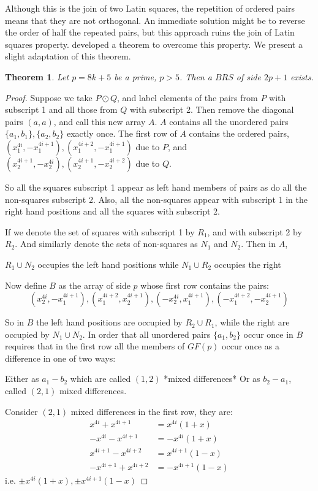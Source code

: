 \documentclass[
  11pt,
  a4paper]{book}\usepackage[]{graphicx}\usepackage[]{xcolor}
\newtheorem{theorem}{Theorem}
\begin{document}
Although this is the join of two Latin squares, the
repetition of ordered pairs means that they are not
orthogonal. An immediate solution might be to reverse the
order of half the repeated pairs, but this approach ruins
the join of Latin squares property.
\cite{andersonConstructionBalancedRoom1999}
developed a theorem to overcome this property. We present a
slight adaptation of this theorem.
\begin{theorem}
Let $p = 8k + 5$ be a prime, $p > 5$. Then a $BRS$ of side
$2p + 1$ exists.
\end{theorem}
\begin{proof}
Suppose we take $P \odot Q$, and label elements of the pairs
from $P$ with subscript 1 and all those from $Q$ with
subscript 2. Then remove the diagonal pairs $(a, a)$, and
call this new array $A$. $A$ contains all the unordered
pairs $\{a_1, b_1\},\{a_2, b_2\}$ exactly once. The first row
of $A$ contains the ordered pairs,
$(x_1^{4i}, -x_1^{4i + 1}), (x_1^{4i + 2}, -x_1^{4i + 1})$
due to $P$, and
$(x_2^{4i + 1}, -x_2^{4i}), (x_2^{4i + 1}, -x_2^{4i  +2})$
due to $Q$.

So all the squares subscript 1 appear as left hand members
of pairs as do all the non-squares subscript 2. Also, all
the non-squares appear with subscript 1 in the right hand
positions and all the squares with
subscript 2.

If we denote the set of squares with subscript 1 by $R_1$,
and with subscript 2 by $R_2$. And similarly denote the sets
of non-squares as $N_1$ and $N_2$. Then in $A$,

$R_1 \cup N_2$ occupies the left hand positions
while $N_1 \cup R_2$ occupies the right

Now define $B$ as the array of side $p$ whose first row
contains the pairs:
\begin{equation}
(x_2^{4i}, -x_1^{4i + 1}), (x_1^{4i + 2}, x_2^{4i + 1}), (-x_2^{4i}, x_1^{4i + 1}), (-x_1^{4i + 2}, -x_2^{4i + 1})
\end{equation}

So in $B$ the left hand positions are occupied by
$R_2 \cup R_1$, while the right are occupied by
$N_1 \cup N_2$.  In order that all unordered pairs
$\{a_1, b_2\}$ occur once in $B$ requires that in the first
row all the members of $GF(p)$ occur once as a difference
in one of two ways:

Either as $a_1 - b_2$ which are called $(1, 2)$
*mixed differences* Or as $b_2 - a_1$, called $(2, 1)$
mixed differences.

Consider $(2, 1)$ mixed differences in the first row, they
are:
\begin{align*}
       x^{4i} + x^{4i + 1} &= x^{4i}(1 + x)      \\
      -x^{4i} - x^{4i + 1} &=-x^{4i}(1 + x)      \\
   x^{4i + 1} - x^{4i + 2} &= x^{4i + 1}(1 - x)  \\
  -x^{4i + 1} + x^{4i + 2} &= -x^{4i + 1}(1 - x)
\end{align*}
i.e. $\pm x^{4i}(1 + x), \pm x^{4i + 1}(1 - x)$


\end{proof}
\end{document}
